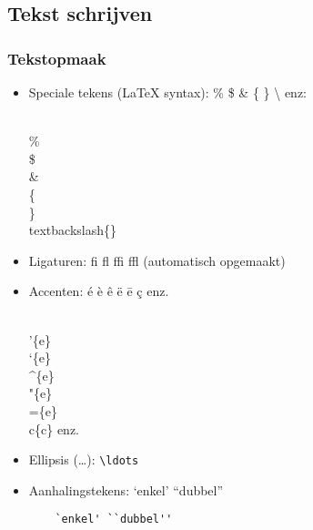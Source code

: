 \documentclass[aspectratio=169]{beamer}
\begin{document}
\subsection{Tekst schrijven}

\begin{frame}[fragile]
  \frametitle{Tekstopmaak}
  
  \begin{itemize}
    \item<+-> Speciale tekens ({\LaTeX} syntax): \% \$ \& \{ \} \textbackslash{} enz: \\
    \begin{semiverbatim}
      \\\% \\\$ \\\& \\\{ \\\} \\textbackslash\{\}
    \end{semiverbatim}
    \item<+-> Ligaturen: \textrm{fi fl ffi ffl} (automatisch opgemaakt)
    \item<+-> Accenten: \'{e} \`{e} \^{e} \"{e} \={e} \c{c} enz.
    \begin{semiverbatim}
      \\'\{e\} \\`\{e\} \\^\{e\} \\"\{e\} \\=\{e\} \\c\{c\} enz.
    \end{semiverbatim}
    \item<+-> Ellipsis (\ldots): \texttt{\textbackslash{}ldots}
    \item<+-> Aanhalingstekens: `enkel' ``dubbel''
    \begin{verbatim}
    `enkel' ``dubbel''
    \end{verbatim}
  \end{itemize}
\end{frame}
\end{document}
